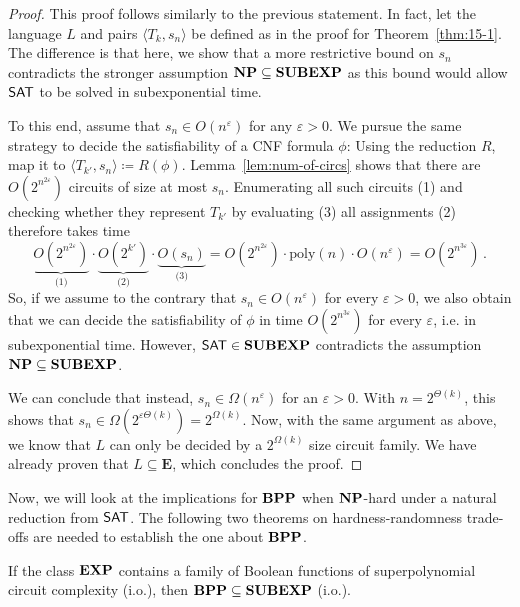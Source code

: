 \documentclass[11pt]{article}
\begin{document}
\begin{proof}
  This proof follows similarly to the previous statement.
  In fact, let the language $L$ and pairs $\langle T_k, s_n \rangle$ be defined
  as in the proof for Theorem~\ref{thm:15-1}.
  The difference is that here, we show that a more restrictive bound on
  $s_n$ contradicts the stronger assumption $\mathbf{NP} \subseteq \mathbf{SUBEXP}$ as
  this bound would allow $\mathsf{SAT}$ to be solved in subexponential time.

  To this end, assume that $s_n \in O(n^\varepsilon)$ for any
  $\varepsilon > 0$.
  We pursue the same strategy to decide the satisfiability of a CNF formula
  $\phi$: Using the reduction $R$, map it to
  $\langle T_{k'}, s_n \rangle \coloneqq R(\phi)$.
  Lemma~\ref{lem:num-of-circs} shows that there are
  $O(2^{n^{2 \varepsilon}})$ circuits of size at most $s_n$.
  Enumerating all such circuits (1) and checking whether they represent
  $T_{k'}$ by evaluating (3) all assignments (2) therefore takes time
  \[
    \underbrace{O(2^{n^{2 \varepsilon}})}_{\textrm{(1)}} \cdot
    \underbrace{O(2^{k'})}_{\textrm{(2)}} \cdot 
    \underbrace{O(s_n)}_{\textrm{(3)}}
    =
    O(2^{n^{2 \varepsilon}}) \cdot
    \mathrm{poly}(n) \cdot
    O(n^\varepsilon)
    =
    O(2^{n^{3 \varepsilon}}) \,.
  \]
  So, if we assume to the contrary that
  $s_n \in O(n^\varepsilon)$ for every $\varepsilon > 0$,
  we also obtain that we can decide the satisfiability of $\phi$ in time
  $O(2^{n^{3 \varepsilon}})$ for every $\varepsilon$, i.e.
  in subexponential time.
  However, $\mathsf{SAT} \in \mathbf{SUBEXP}$
  contradicts the assumption $\mathbf{NP} \subseteq \mathbf{SUBEXP}$.

  We can conclude that instead, $s_n \in \Omega(n^\varepsilon)$
  for an $\varepsilon > 0$.
  With $n = 2^{\Theta(k)}$, this shows that
  $s_n \in \Omega(2^{\varepsilon \Theta(k)}) = 2^{\Omega(k)}$.
  Now, with the same argument as above, we know that $L$ can only be decided
  by a $2^{\Omega(k)}$ size circuit family. We have already proven that
  $L \subseteq \mathbf E$, which concludes the proof.
\end{proof}

Now, we will look at the implications for $\mathbf{BPP}$ when $\mathbf{NP}$-hard under a natural reduction from $\mathsf{SAT}$. The following two theorems on hardness-randomness trade-offs are needed to establish the one about $\mathbf{BPP}$.

\begin{theorem}
  \label{thm:bpp-in-subexp}
	If the class $\mathbf{EXP}$ contains a family of Boolean functions of superpolynomial circuit complexity (i.o.), then $\mathbf{BPP} \subseteq \mathbf{SUBEXP}$ (i.o.).
\end{theorem}
\end{document}
